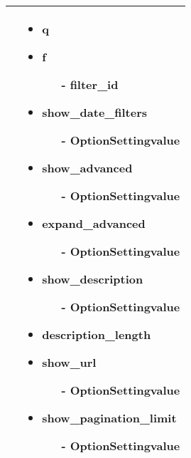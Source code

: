 \begin{minipage}{0.7\textwidth}
\begin{tabular}{|p{} | p{}|}
 & 
\begin{itemize}
\item q
\item f
 \begin{enumerate}
 \item[-] filter\_id
 \end{enumerate}
\item show\_date\_filters
\begin{enumerate}
 	\item[-] OptionSettingvalue
 \end{enumerate} 
\item show\_advanced
\begin{enumerate}
 	\item[-] OptionSettingvalue
 \end{enumerate} 
\item expand\_advanced
\begin{enumerate}
 	\item[-] OptionSettingvalue
 \end{enumerate} 
\item show\_description
\begin{enumerate}
 	\item[-] OptionSettingvalue
 \end{enumerate} 
\item description\_length 
\item show\_url
\begin{enumerate}
 	\item[-] OptionSettingvalue
 \end{enumerate}
\item show\_pagination\_limit
\begin{enumerate}
 	\item[-] OptionSettingvalue
 \end{enumerate} 
\end{itemize}
\\
\hline
\end{tabular}
\end{minipage}

